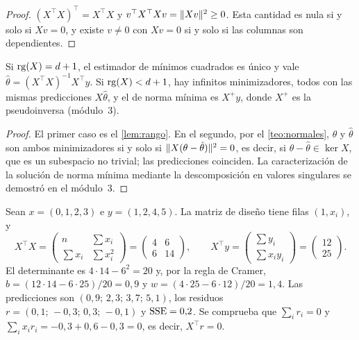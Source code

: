 \begin{proof}
$(X^{\top}X)^{\top}=X^{\top}X$ y $v^{\top}X^{\top}Xv=\lVert Xv\rVert^{2}\ge 0$. Esta cantidad es nula si y solo si $Xv=0$, y existe $v\ne 0$ con $Xv=0$ si y solo si las columnas son dependientes.
\end{proof}

\begin{corolario}[Unicidad]\label{cor:unicidad}
Si $\operatorname{rg}(X)=d+1$, el estimador de mínimos cuadrados es único y vale $\hat\theta=(X^{\top}X)^{-1}X^{\top}y$. Si $\operatorname{rg}(X)<d+1$, hay infinitos minimizadores, todos con las mismas predicciones $X\hat\theta$, y el de norma mínima es $X^{+}y$, donde $X^{+}$ es la pseudoinversa (módulo~3).
\end{corolario}

\begin{proof}
El primer caso es el \cref{lem:rango}. En el segundo, por el \cref{teo:normales}, $\theta$ y $\hat\theta$ son ambos minimizadores si y solo si $\lVert X(\theta-\hat\theta)\rVert^{2}=0$, es decir, si $\theta-\hat\theta\in\ker X$, que es un subespacio no trivial; las predicciones coinciden. La caracterización de la solución de norma mínima mediante la descomposición en valores singulares se demostró en el módulo~3.
\end{proof}

\begin{ejemplo}\label{ej:recta}
Sean $x=(0,1,2,3)$ e $y=(1,2,4,5)$. La matriz de diseño tiene filas $(1,x_i)$, y
\[
X^{\top}X=\begin{pmatrix} n & \sum x_i\\ \sum x_i & \sum x_i^{2}\end{pmatrix}=\begin{pmatrix}4&6\\6&14\end{pmatrix},\qquad
X^{\top}y=\begin{pmatrix}\sum y_i\\ \sum x_iy_i\end{pmatrix}=\begin{pmatrix}12\\25\end{pmatrix}.
\]
El determinante es $4\cdot 14-6^{2}=20$ y, por la regla de Cramer, $b=(12\cdot 14-6\cdot 25)/20=0{,}9$ y $w=(4\cdot 25-6\cdot 12)/20=1{,}4$. Las predicciones son $(0{,}9;\,2{,}3;\,3{,}7;\,5{,}1)$, los residuos $r=(0{,}1;\,-0{,}3;\,0{,}3;\,-0{,}1)$ y $\operatorname{SSE}=0{,}2$. Se comprueba que $\sum_i r_i=0$ y $\sum_i x_ir_i=-0{,}3+0{,}6-0{,}3=0$, es decir, $X^{\top}r=0$.
\end{ejemplo}

